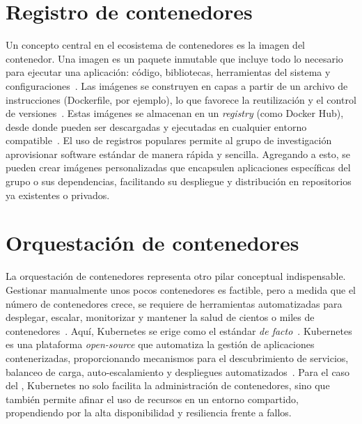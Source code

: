\section{Registro de contenedores}
\noindent
Un concepto central en el ecosistema de contenedores es la imagen del contenedor. Una imagen es un paquete inmutable que incluye todo lo necesario para ejecutar una aplicación: código, bibliotecas, herramientas del sistema y configuraciones~\citep{straesser2023empirical}. Las imágenes se construyen en capas a partir de un archivo de instrucciones (Dockerfile, por ejemplo), lo que favorece la reutilización y el control de versiones~\citep{dahlmanns2023secrets}. Estas imágenes se almacenan en un \textit{registry} (como Docker Hub), desde donde pueden ser descargadas y ejecutadas en cualquier entorno compatible~\citep{anwar2018improving}. El uso de registros populares permite al grupo de investigación aprovisionar software estándar de manera rápida y sencilla. Agregando a esto, se pueden crear imágenes personalizadas que encapsulen aplicaciones específicas del grupo o sus dependencias, facilitando su despliegue y distribución en repositorios ya existentes o privados.

\section{Orquestación de contenedores}
\noindent
La orquestación de contenedores representa otro pilar conceptual indispensable. Gestionar manualmente unos pocos contenedores es factible, pero a medida que el número de contenedores crece, se requiere de herramientas automatizadas para desplegar, escalar, monitorizar y mantener la salud de cientos o miles de contenedores~\citep{al2019container}. Aquí, Kubernetes se erige como el estándar \textit{de facto}~\citep{zhou2021container}. Kubernetes es una plataforma \textit{open-source} que automatiza la gestión de aplicaciones contenerizadas, proporcionando mecanismos para el descubrimiento de servicios, balanceo de carga, auto-escalamiento y despliegues automatizados~\citep{carrion2022kubernetes}. Para el caso del \GRID, Kubernetes no solo facilita la administración de contenedores, sino que también permite afinar el uso de recursos en un entorno compartido, propendiendo por la alta disponibilidad y resiliencia frente a fallos.

